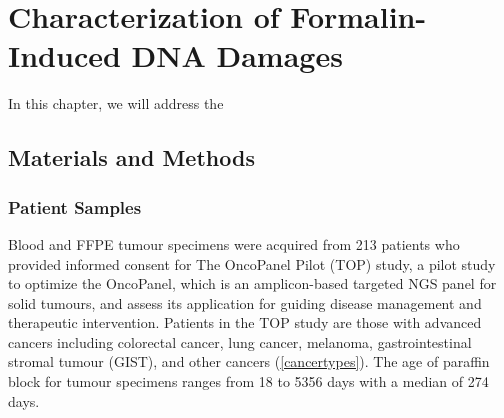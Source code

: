 
\chapter{Characterization of Formalin-Induced DNA Damages}
\label{ch:CharacterizationofFormalin-InducedDNADamages}

In this chapter, we will address the

\section{Materials and Methods}
\label{sec:MaterialsandMethods}

\subsection{Patient Samples}

Blood and FFPE tumour specimens were acquired from 213 patients who provided informed consent for The OncoPanel Pilot (TOP) study, a pilot study to optimize the OncoPanel, which is an amplicon-based targeted NGS panel for solid tumours, and assess its application for guiding disease management and therapeutic intervention. Patients in the TOP study are those with advanced cancers including colorectal cancer, lung cancer, melanoma, gastrointestinal stromal tumour (GIST), and other cancers (\autoref{cancertypes}). The age of paraffin block for tumour specimens ranges from 18 to 5356 days with a median of 274 days.

